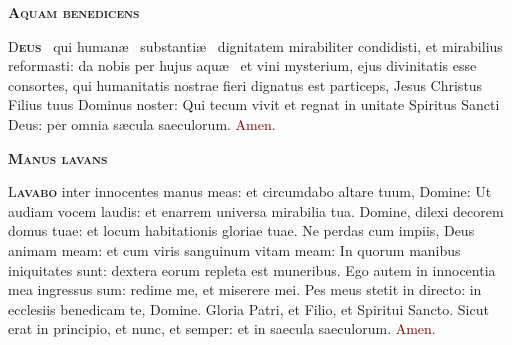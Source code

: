 \documentclass[12pt,a4paper]{scrartcl}
\newcommand{\krzyz}{\textcolor{red}{\raisebox{-1mm}{\scalebox{1.5}{\ding{64}}}}}
\begin{document}
\thispagestyle{empty}

\pagecolor{fondpaille}
\color{darkgreen}

\begin{center}

    \begin{minipage}{0.7\linewidth}

        \vspace*{2.7cm}

        \begin{center}
            \scshape\bfseries\Huge
            Aquam benedicens
        \end{center}

        \vspace*{0.1cm}

        \LARGE\justify

        \lettrine[lines=3]{\color{Maroon}D}{\bfseries\color{Maroon}eus}
        \krzyz~qui human\ae~ substanti\ae~ dignitatem mirabiliter condidisti, et
        mirabilius reformasti: da nobis per hujus aqu\ae~ et vini mysterium,
        ejus divinitatis esse consortes, qui humanitatis nostrae fieri dignatus
        est particeps, Jesus Christus Filius tuus Dominus noster: Qui tecum
        vivit et regnat in unitate Spiritus Sancti Deus: per omnia s\ae cula
        saeculorum. \textcolor{Maroon}{Amen.}\\

        \vspace*{0.1cm}

        \centerline{
            \scshape\bfseries\Huge
            Manus lavans}

        \vspace*{0.1cm}

        \LARGE\justify

        \lettrine[lines=3]{\color{Maroon}L}{\bfseries\color{Maroon}avabo} inter
        innocentes manus meas: et circumdabo altare tuum, Domine: Ut audiam
        vocem laudis: et enarrem universa mirabilia tua. Domine, dilexi decorem
        domus tuae: et locum habitationis gloriae tuae. Ne perdas cum impiis,
        Deus animam meam: et cum viris sanguinum vitam meam: In quorum manibus
        iniquitates sunt: dextera eorum repleta est muneribus. Ego autem in
        innocentia mea ingressus sum: redime me, et miserere mei. Pes meus
        stetit in directo: in ecclesiis benedicam te, Domine. Gloria Patri, et
        Filio, et Spiritui Sancto. Sicut erat in principio, et nunc, et semper:
        et in saecula saeculorum. \textcolor{Maroon}{Amen.}
    \end{minipage}
\end{center}

\vspace*{1cm}
\end{document}
